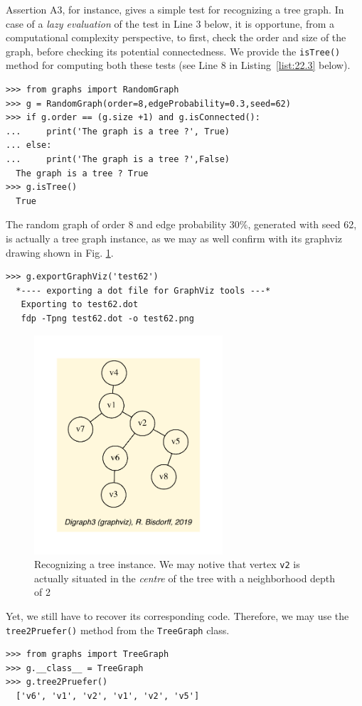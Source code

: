 Assertion A3, for instance, gives a simple test for recognizing a tree graph. In case of a \emph{lazy evaluation} of the test in Line 3 below, it is opportune, from a computational complexity perspective, to first, check the order and size of the graph, before checking its potential connectedness. We provide the \texttt{isTree()} method for computing both these tests (see Line 8 in Listing~\ref{list:22.3} below).
\begin{lstlisting}[caption={Recognizing a tree graph.},label=list:22.3]
>>> from graphs import RandomGraph
>>> g = RandomGraph(order=8,edgeProbability=0.3,seed=62)
>>> if g.order == (g.size +1) and g.isConnected():
...     print('The graph is a tree ?', True)
... else:
...     print('The graph is a tree ?',False)   
  The graph is a tree ? True
>>> g.isTree()
  True  
\end{lstlisting}
The random graph of order 8 and edge probability $30\%$, generated with seed 62, is actually a tree graph instance, as we may as well confirm with its graphviz drawing shown in Fig. \ref{fig:22.3}.
\begin{lstlisting}
>>> g.exportGraphViz('test62')
  *---- exporting a dot file for GraphViz tools ---*
   Exporting to test62.dot
   fdp -Tpng test62.dot -o test62.png
\end{lstlisting}
\begin{figure}[h]
\sidecaption[t]
\includegraphics[width=7cm]{Figures/test62.pdf}
\caption{Recognizing a tree instance. We may notive that vertex \texttt{v2} is actually situated in the \emph{centre} of the tree with a neighborhood depth of 2} 
\label{fig:22.3}       %
\end{figure}

Yet, we still have to recover its corresponding \Pruefer code. Therefore, we may use the \texttt{tree2Pruefer()} method  from the \texttt{TreeGraph} class.
\begin{lstlisting}[caption={Computing the \Pruefer code of a tree graph instance.},label=list:22.4]
>>> from graphs import TreeGraph
>>> g.__class__ = TreeGraph  
>>> g.tree2Pruefer()
  ['v6', 'v1', 'v2', 'v1', 'v2', 'v5']
\end{lstlisting}


